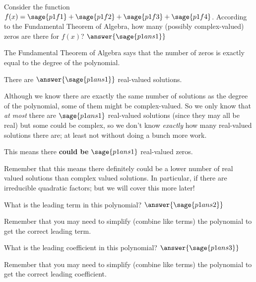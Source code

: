 \documentclass{ximera}
\begin{document}
\begin{problem}
Consider the function $f(x) = \sage{p1f1} + \sage{p1f2} + \sage{p1f3} + \sage{p1f4}$. According to the Fundamental Theorem of Algebra, how many (possibly complex-valued) zeros are there for $f(x)$? $\answer{\sage{p1ans1}}$
    \begin{feedback}
        The Fundamental Theorem of Algebra says that the number of zeros is exactly equal to the degree of the polynomial.
    \end{feedback}
    
    \begin{problem}
        There are  $\answer{\sage{p1ans1}}$ real-valued solutions. 
        \begin{feedback}[correct]
            Although we know there are exactly the same number of solutions as the degree of the polynomial, some of them might be complex-valued. So we only know that \textit{at most} there are $\sage{p1ans1}$ real-valued solutions (since they may all be real) but some could be complex, so we don't know \textit{exactly} how many real-valued solutions there are; at least not without doing a bunch more work.
        \end{feedback}
        
        \begin{problem}
            This means there \textbf{could be}  $\sage{p1ans1}$ real-valued zeros.
            \begin{feedback}[correct]
                Remember that this means there definitely could be a lower number of real valued solutions than complex valued solutions. In particular, if there are irreducible quadratic factors; but we will cover this more later!
            \end{feedback}
            
        \end{problem}
    \end{problem}
    \begin{problem}
        What is the leading term in this polynomial? $\answer{\sage{p1ans2}}$
        \begin{feedback}
            Remember that you may need to simplify (combine like terms) the polynomial to get the correct leading term.
        \end{feedback}
    \end{problem}
    \begin{problem}
        What is the leading coefficient in this polynomial? $\answer{\sage{p1ans3}}$
        \begin{feedback}
            Remember that you may need to simplify (combine like terms) the polynomial to get the correct leading coefficient.
        \end{feedback}
    \end{problem}
    
\end{problem}
\end{document}
